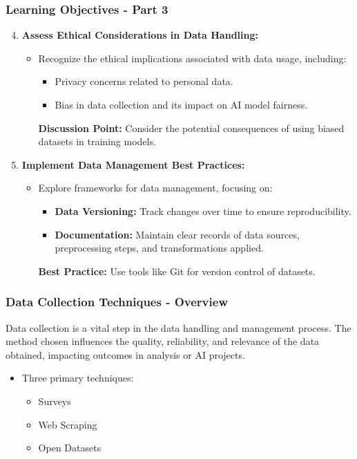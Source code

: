\documentclass[aspectratio=169]{beamer}
\begin{document}
\begin{frame}[fragile]
    \frametitle{Learning Objectives - Part 3}
    \begin{enumerate}
        \setcounter{enumi}{3}
        \item \textbf{Assess Ethical Considerations in Data Handling:}
        \begin{itemize}
            \item Recognize the ethical implications associated with data usage, including:
            \begin{itemize}
                \item Privacy concerns related to personal data.
                \item Bias in data collection and its impact on AI model fairness.
            \end{itemize}
            \textbf{Discussion Point:} Consider the potential consequences of using biased datasets in training models.
        \end{itemize}
        
        \item \textbf{Implement Data Management Best Practices:}
        \begin{itemize}
            \item Explore frameworks for data management, focusing on:
            \begin{itemize}
                \item \textbf{Data Versioning:} Track changes over time to ensure reproducibility.
                \item \textbf{Documentation:} Maintain clear records of data sources, preprocessing steps, and transformations applied.
            \end{itemize}
            \textbf{Best Practice:} Use tools like Git for version control of datasets.
        \end{itemize}
    \end{enumerate}
\end{frame}

\begin{frame}
    \frametitle{Data Collection Techniques - Overview}
    Data collection is a vital step in the data handling and management process. The method chosen influences the quality, reliability, and relevance of the data obtained, impacting outcomes in analysis or AI projects. 
    \begin{itemize}
        \item Three primary techniques: 
        \begin{itemize}
            \item Surveys
            \item Web Scraping
            \item Open Datasets
        \end{itemize}
    \end{itemize}
\end{frame}
\end{document}
